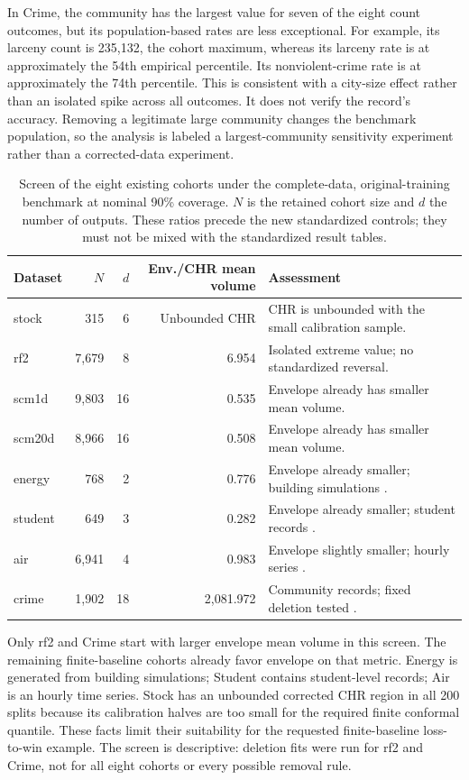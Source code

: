 \documentclass[11pt,letterpaper]{article}
\begin{document}
In Crime, the community has the largest value for seven of the eight count
outcomes, but its population-based rates are less exceptional. For example,
its larceny count is 235,132, the cohort maximum, whereas its larceny rate
is at approximately the 54th empirical percentile. Its nonviolent-crime rate
is at approximately the 74th percentile. This is consistent with a city-size
effect rather than an isolated spike across all outcomes. It does not verify
the record's accuracy. Removing a legitimate large community changes the
benchmark population, so the analysis is labeled a largest-community sensitivity
experiment rather than a corrected-data experiment.

\begin{table}[htbp]
\centering\small
\caption{Screen of the eight existing cohorts under the complete-data,
original-training benchmark at nominal 90\% coverage. $N$ is the retained
cohort size and $d$ the number of outputs. These ratios precede the new
standardized controls; they must not be mixed with the standardized result tables.}
\label{tab:screen}
\begin{tabular}{lrrrp{6.4cm}}
\toprule
Dataset & $N$ & $d$ & Env./CHR mean volume & Assessment\\
\midrule
stock & 315 & 6 & Unbounded CHR & CHR is unbounded with the small calibration sample. \\
rf2 & 7,679 & 8 & 6.954 & Isolated extreme value; no standardized reversal. \\
scm1d & 9,803 & 16 & 0.535 & Envelope already has smaller mean volume. \\
scm20d & 8,966 & 16 & 0.508 & Envelope already has smaller mean volume. \\
energy & 768 & 2 & 0.776 & Envelope already smaller; building simulations \cite{energy}. \\
student & 649 & 3 & 0.282 & Envelope already smaller; student records \cite{student}. \\
air & 6,941 & 4 & 0.983 & Envelope slightly smaller; hourly series \cite{air}. \\
crime & 1,902 & 18 & 2,081.972 & Community records; fixed deletion tested \cite{crime}. \\
\bottomrule
\end{tabular}
\end{table}

Only rf2 and Crime start with larger envelope mean volume in this screen.
The remaining finite-baseline cohorts already favor envelope on that metric.
Energy is generated from building simulations; Student contains student-level
records; Air is an hourly time series. Stock has an unbounded corrected CHR
region in all 200 splits because its calibration halves are too small for
the required finite conformal quantile. These facts limit their suitability
for the requested finite-baseline loss-to-win example. The screen is
descriptive: deletion fits were run for rf2 and Crime, not for all eight
cohorts or every possible removal rule.
\end{document}
